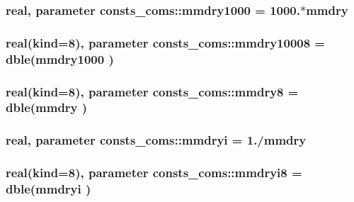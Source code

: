 \subsubsection[{\texorpdfstring{mmdry1000}{mmdry1000}}]{\setlength{\rightskip}{0pt plus 5cm}real, parameter consts\+\_\+coms\+::mmdry1000 = 1000.$\ast${\bf mmdry}}\hypertarget{namespaceconsts__coms_a17fe564075e4435419515e05d8a82022}{}\label{namespaceconsts__coms_a17fe564075e4435419515e05d8a82022}
\subsubsection[{\texorpdfstring{mmdry10008}{mmdry10008}}]{\setlength{\rightskip}{0pt plus 5cm}real(kind=8), parameter consts\+\_\+coms\+::mmdry10008 = dble({\bf mmdry1000} )}\hypertarget{namespaceconsts__coms_a22496e0e01ad463e5cc3cd1b4527193f}{}\label{namespaceconsts__coms_a22496e0e01ad463e5cc3cd1b4527193f}
\subsubsection[{\texorpdfstring{mmdry8}{mmdry8}}]{\setlength{\rightskip}{0pt plus 5cm}real(kind=8), parameter consts\+\_\+coms\+::mmdry8 = dble({\bf mmdry} )}\hypertarget{namespaceconsts__coms_a2eec42ad330677699998e5de193f8de3}{}\label{namespaceconsts__coms_a2eec42ad330677699998e5de193f8de3}
\subsubsection[{\texorpdfstring{mmdryi}{mmdryi}}]{\setlength{\rightskip}{0pt plus 5cm}real, parameter consts\+\_\+coms\+::mmdryi = 1./{\bf mmdry}}\hypertarget{namespaceconsts__coms_a3a3fc200d63c11c0ae055b6b513fd309}{}\label{namespaceconsts__coms_a3a3fc200d63c11c0ae055b6b513fd309}
\subsubsection[{\texorpdfstring{mmdryi8}{mmdryi8}}]{\setlength{\rightskip}{0pt plus 5cm}real(kind=8), parameter consts\+\_\+coms\+::mmdryi8 = dble({\bf mmdryi} )}\hypertarget{namespaceconsts__coms_a3c57cfb68a588ad22205f473b45b0473}{}\label{namespaceconsts__coms_a3c57cfb68a588ad22205f473b45b0473}
